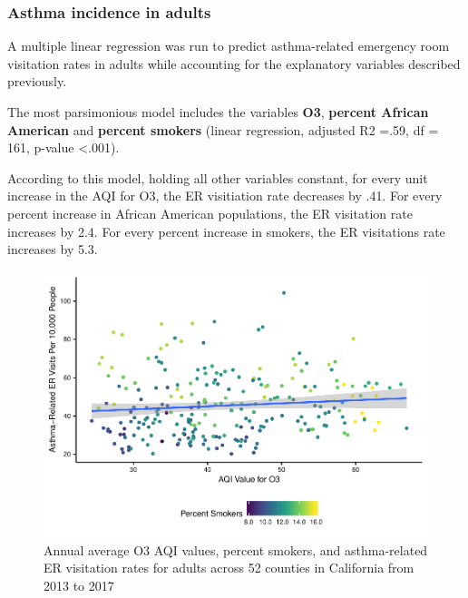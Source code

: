 \documentclass[12pt,]{article}
\begin{document}
\newpage

\hypertarget{asthma-incidence-in-adults}{%
\subsubsection{Asthma incidence in
adults}\label{asthma-incidence-in-adults}}

A multiple linear regression was run to predict asthma-related emergency
room visitation rates in adults while accounting for the explanatory
variables described previously.

The most parsimonious model includes the variables \textbf{O3},
\textbf{percent African American} and \textbf{percent smokers} (linear
regression, adjusted R2 =.59, df = 161, p-value \textless{}.001).

According to this model, holding all other variables constant, for every
unit increase in the AQI for O3, the ER visitiation rate decreases by
.41. For every percent increase in African American populations, the ER
visitation rate increases by 2.4. For every percent increase in smokers,
the ER visitations rate increases by 5.3.

\begin{figure}
\centering
\includegraphics{FinalProject_AliciaZhao_files/figure-latex/unnamed-chunk-24-1.pdf}
\caption{Annual average O3 AQI values, percent smokers, and
asthma-related ER visitation rates for adults across 52 counties in
California from 2013 to 2017}
\end{figure}
\end{document}
